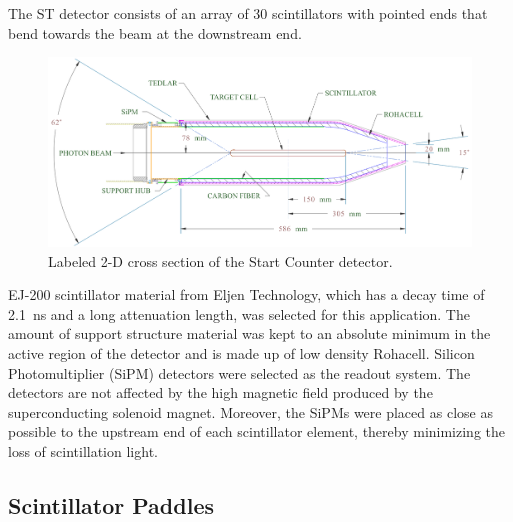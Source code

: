 The ST detector consists of an array of 30 scintillators with pointed ends that bend towards the beam at the downstream end. 
	\begin{figure}[!htb]
		\centering
		\includegraphics[width=1.0\columnwidth]{design/figs/st_2d_labels}
		\caption{Labeled 2-D cross section of the Start Counter detector.}
		\label{fig:st2dlabels}
	\end{figure}
EJ-200 scintillator material from Eljen Technology\cite{eljen}, which has a decay time of 2.1~ns and a long attenuation length\cite{ej200_specs}, was selected for this application.  The amount of support structure material was kept to an absolute minimum in the active region of the detector and is made up of low density Rohacell\cite{rohacell}. Silicon Photomultiplier (SiPM) detectors were selected as the readout system. The detectors are not affected by the high magnetic field produced by the superconducting solenoid magnet. Moreover, the SiPMs were placed as close as possible to the upstream end of each scintillator element, thereby minimizing the loss of scintillation light\cite{pooser16}.

\subsection{Scintillator Paddles} \label{sec:design_paddles}


